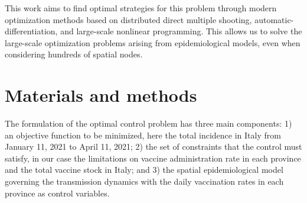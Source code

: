 This work aims to find optimal strategies for this problem through modern optimization methods based on distributed direct multiple shooting, automatic-differentiation, and large-scale nonlinear programming\cite{Bock:MultipleShootingAlgorithm:1984,Savorgnan:MultipleShootingDistributed:2011,Andersson:CasADiSoftwareFramework:2018,Wachter:ImplementationInteriorpointFilter:2006}. This allows us to solve the large-scale optimization problems arising from epidemiological models, even when considering hundreds of spatial nodes. 


\section{Materials and methods} \label{sec:matmet}
The formulation of the optimal control problem has three main components: 1) an objective function to be minimized, here the total incidence in Italy from January 11, 2021 to April 11, 2021; 2) the set of constraints that the control must satisfy, in our case the limitations on vaccine administration rate in each province and the total vaccine stock in Italy; and 3) the spatial epidemiological model\cite{Gatto:SpreadDynamicsCOVID19:2020, Bertuzzo:GeographyCOVID19Spread:2020} governing the transmission dynamics with the daily vaccination rates in each province as control variables.

